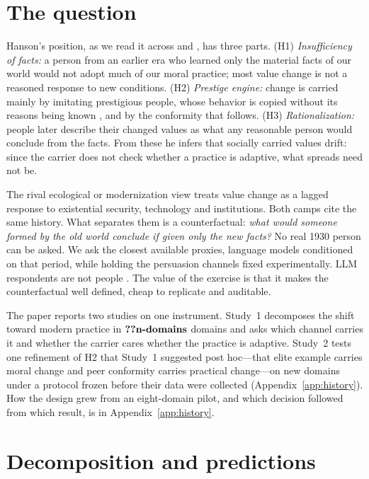 \documentclass[11pt]{article}
\makeatletter
\newcommand{\nv}[1]{\ifcsname n@#1\endcsname\csname n@#1\endcsname\else\textbf{??#1}\fi}
\makeatother
\begin{document}
\section{The question}

Hanson's position, as we read it across \cite{hanson2026} and \cite{simler2018elephant}, has three parts.
(H1) \emph{Insufficiency of facts:} a person from an earlier era who learned only the material facts of our world would not adopt much of our moral practice; most value change is not a reasoned response to new conditions.
(H2) \emph{Prestige engine:} change is carried mainly by imitating prestigious people, whose behavior is copied without its reasons being known \cite{henrich2001prestige,boyd1985culture,henrich2016secret}, and by the conformity that follows.
(H3) \emph{Rationalization:} people later describe their changed values as what any reasonable person would conclude from the facts.
From these he infers that socially carried values drift: since the carrier does not check whether a practice is adaptive, what spreads need not be.

The rival ecological or modernization view \cite{inglehart2005modernization} treats value change as a lagged response to existential security, technology and institutions.
Both camps cite the same history.
What separates them is a counterfactual: \emph{what would someone formed by the old world conclude if given only the new facts?}
No real 1930 person can be asked.
We ask the closest available proxies, language models conditioned on that period, while holding the persuasion channels fixed experimentally.
LLM respondents are not people \cite{argyle2023outofone,santurkar2023whose,dillion2023can}.
The value of the exercise is that it makes the counterfactual well defined, cheap to replicate and auditable.

The paper reports two studies on one instrument.
Study~1 decomposes the shift toward modern practice in $\nv{n-domains}$ domains and asks which channel carries it and whether the carrier cares whether the practice is adaptive.
Study~2 tests one refinement of H2 that Study~1 suggested post hoc---that elite example carries moral change and peer conformity carries practical change---on new domains under a protocol frozen before their data were collected (Appendix~\ref{app:history}).
How the design grew from an eight-domain pilot, and which decision followed from which result, is in Appendix~\ref{app:history}.

\section{Decomposition and predictions}
\label{sec:decomposition}
\end{document}
